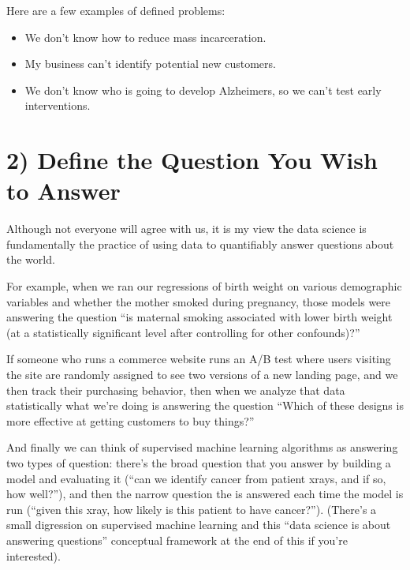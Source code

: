 \documentclass[letterpaper,10pt,english]{jupyterBook}
\begin{document}
\sphinxAtStartPar
Here are a few examples of defined problems:
\begin{itemize}
\item {} 
\sphinxAtStartPar
We don’t know how to reduce mass incarceration.

\item {} 
\sphinxAtStartPar
My business can’t identify potential new customers.

\item {} 
\sphinxAtStartPar
We don’t know who is going to develop Alzheimers, so we can’t test early interventions.

\end{itemize}


\section{2) Define the Question You Wish to Answer}
\label{\detokenize{40_in_practice/00_backwards_design:define-the-question-you-wish-to-answer}}
\sphinxAtStartPar
Although not everyone will agree with us, it is my view the data science is fundamentally the practice of using data to quantifiably answer questions about the world.

\sphinxAtStartPar
For example, when we ran our regressions of birth weight on various demographic variables and whether the mother smoked during pregnancy, those models were answering the question “is maternal smoking associated with lower birth weight (at a statistically significant level after controlling for other confounds)?”

\sphinxAtStartPar
If someone who runs a commerce website runs an A/B test where users visiting the site are randomly assigned to see two versions of a new landing page, and we then track their purchasing behavior, then when we analyze that data statistically what we’re doing is answering the question “Which of these designs is more effective at getting customers to buy things?”

\sphinxAtStartPar
And finally we can think of supervised machine learning algorithms as answering two types of question: there’s the broad question that you answer by building a model and evaluating it (“can we identify cancer from patient x\sphinxhyphen{}rays, and if so, how well?”), and then the narrow question the is answered each time the model is run (“given this x\sphinxhyphen{}ray, how likely is this patient to have cancer?”). (There’s a small digression on supervised machine learning and this “data science is about answering questions” conceptual framework at the end of this if you’re interested).
\end{document}
